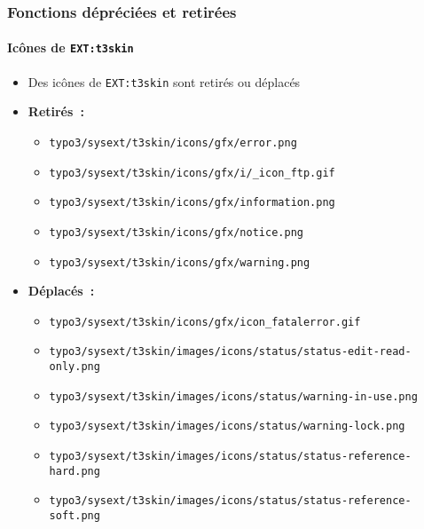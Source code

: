 
\begin{frame}[fragile]
	\frametitle{Fonctions dépréciées et retirées}
	\framesubtitle{Icônes de \texttt{EXT:t3skin}}

	\begin{itemize}

		\item Des icônes de \texttt{EXT:t3skin} sont retirés ou déplacés
		\item \textbf{Retirés~:}

			\begin{itemize}
				\item \smaller\texttt{typo3/sysext/t3skin/icons/gfx/error.png}
				\item \texttt{typo3/sysext/t3skin/icons/gfx/i/\_icon\_ftp.gif}
				\item \texttt{typo3/sysext/t3skin/icons/gfx/information.png}
				\item \texttt{typo3/sysext/t3skin/icons/gfx/notice.png}
				\item \texttt{typo3/sysext/t3skin/icons/gfx/warning.png}
			\end{itemize}

		\item \textbf{Déplacés~:}

			\begin{itemize}
				\item \smaller\texttt{typo3/sysext/t3skin/icons/gfx/icon\_fatalerror.gif}
				\item \texttt{typo3/sysext/t3skin/images/icons/status/status-edit-read-only.png}
				\item \texttt{typo3/sysext/t3skin/images/icons/status/warning-in-use.png}
				\item \texttt{typo3/sysext/t3skin/images/icons/status/warning-lock.png}
				\item \texttt{typo3/sysext/t3skin/images/icons/status/status-reference-hard.png}
				\item \texttt{typo3/sysext/t3skin/images/icons/status/status-reference-soft.png}
			\end{itemize}

	\end{itemize}

\end{frame}

